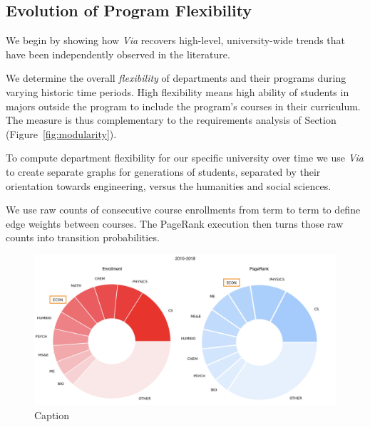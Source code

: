 \subsection{Evolution of Program Flexibility}
\label{sec:course_pref_evolution}

We begin by showing how {\em Via} recovers high-level, university-wide
trends that have been independently observed in the literature.

We determine the overall {\em flexibility} of departments and their
programs during varying historic time periods. High flexibility means
high ability of students in majors outside the program to include the
program's courses in their curriculum. The measure is thus
complementary to the requirements analysis of
Section~ (Figure~\ref{fig:modularity}).

To compute department flexibility for our specific university over
time we use {\em Via} to create separate graphs for generations of
students, separated by their orientation towards engineering, versus
the humanities and social sciences.

We use raw counts of consecutive course enrollments from term to term
to define edge weights between courses. The PageRank execution then
turns those raw counts into transition probabilities.

\begin{figure}
    \centering
    \includegraphics[width=\columnwidth]{Figs/final-enrollment-vs-pagerank.png}
    \caption{Caption}
    \label{fig:my_label}
\end{figure}


